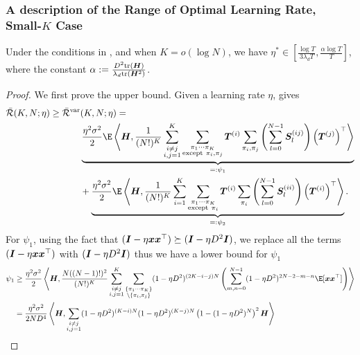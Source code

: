 \subsubsection{A description of the Range of Optimal Learning Rate, Small-$K$ Case}
\begin{lemma} \label{lem:convex-opt-lr-range-small-K}
    Under the conditions in , and when $K=o\left(\log N\right)$, we have $\eta^* \in [\frac{\log T}{3\lambda_d T}, \frac{\alpha\log T}{T}]$, where the constant $\alpha : = \frac{D^2 \mathrm{tr}({\bm{H}})}{\lambda_d \mathrm{tr}({\bm{H}}^2)}$.
\end{lemma}
\begin{proof}
    We first prove the upper bound. Given a learning rate $\eta $,  gives
    \begin{align*}
        \bar\cR(K,N;\eta) \ge \bar\cR^{\var}&(K,N;\eta)=\\
        &\underbrace{\frac{\eta^2\sigma^2}{2}\E\inp{\mH}{\frac{1}{(N!)^K}\sum_{\substack{i\neq j \\i,j=1}}^K\sum_{\substack{\pi_1\cdots \pi_K \\ \text{except} ~\pi_i, \pi_j}}\mT^{(i)}\sum_{\pi_i, \pi_j}\left(\sum_{l=0}^{N-1}\mS_l^{(ij)}\right)\left(\mT^{(j)}\right)^{\top}}}_{=:\psi_1} \\
    &+\underbrace{\frac{\eta^2\sigma^2}{2}\E\inp{\mH}{\frac{1}{(N!)^K}\sum_{i=1}^K\sum_{\substack{\pi_1\cdots \pi_K \\ \text{except} ~\pi_i}}\mT^{(i)}\sum_{\pi_i}\left(\sum_{l=0}^{N-1}\mS_l^{(ii)}\right)\left(\mT^{(i)}\right)^{\top}}}_{=:\psi_2}.
    \end{align*}
For $\psi_1$, using the fact that $({\bm{I}} - \eta {\bm{x}}{\bm{x}}^\top) \succeq ({\bm{I}} - \eta D^2 {\bm{I}})$, we replace all the terms $({\bm{I}} - \eta {\bm{x}}{\bm{x}}^\top)$ with $({\bm{I}} - \eta D^2 {\bm{I}})$ thus we have a lower bound for $\psi_1$
\begin{align*}
    \psi_1 &\ge \frac{\eta^2\sigma^2}{2}\inp{\mH}{\frac{N((N-1)!)^2}{(N!)^K}\sum_{\substack{i\neq j \\i,j=1}}^K\sum_{\substack{\{\pi_1\cdots \pi_K\} \\ \backslash \{\pi_i, \pi_j\}}}(1-
    \eta D^2)^{(2K-i-j)N}\left(\sum_{m,n=0}^{N-1}(1-\eta D^2)^{2N-2-m-n}\E[\vx\vx^\top]\right)}\\
    &= \frac{\eta^2\sigma^2}{2ND^4}\inp{\mH}{\sum_{\substack{i\neq j \\i,j=1}} (1-\eta D^2)^{(K-i)N} (1-\eta D^2)^{(K-j)N} \left(1 - (1 -\eta D^2)^N\right)^2 \mH}\\

\end{align*}
\end{proof}

